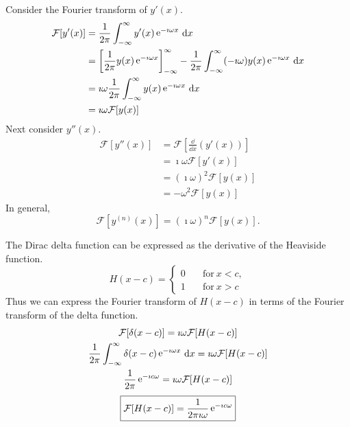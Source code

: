 Consider the Fourier transform of $y'(x)$.
\begin{align*}
  \mathcal{F}[y'(x)]
  &= \frac{1}{2\pi} \int_{-\infty}^\infty y'(x) \mathop{\mathrm{e}}\nolimits^{-\imath \omega x}\,\mathrm{d} x 
  \\
  &= \left[\frac{1}{2\pi} y(x) \mathop{\mathrm{e}}\nolimits^{-\imath \omega x} \right]_{-\infty}^\infty
  - \frac{1}{2\pi} \int_{-\infty}^\infty (-\imath \omega) y(x) \mathop{\mathrm{e}}\nolimits^{-\imath \omega x}\,\mathrm{d} x 
  \\
  &= \imath \omega \frac{1}{2\pi} \int_{-\infty}^\infty y(x) \mathop{\mathrm{e}}\nolimits^{-\imath \omega x}\,\mathrm{d} x 
  \\
  &= \imath \omega \mathcal{F}[y(x)]
\end{align*}
Next consider $y''(x)$.
\begin{align*}
  \mathcal{F}[y''(x)]
  &= \mathcal{F}\left[ \frac{\dd}{\dd x}(y'(x)) \right] 
  \\
  &= \imath \omega \mathcal{F}[y'(x)] 
  \\
  &= (\imath \omega)^2 \mathcal{F}[y(x)] 
  \\
  &= - \omega^2 \mathcal{F}[y(x)]
\end{align*}
In general,
\[ 
\boxed{ 
  \mathcal{F}\left[y^{(n)}(x)\right] = (\imath \omega)^n \mathcal{F}[y(x)]. 
  } 
\]







\begin{Example}
  The Dirac delta function can be expressed as the derivative of the 
  Heaviside function.
  \[ 
  H(x-c) = 
  \begin{cases}
    0 \quad &\mathrm{for}\ x < c, \\
    1 \quad &\mathrm{for}\ x > c
  \end{cases}
  \]
  Thus we can express the Fourier transform of $H(x-c)$ in terms of the Fourier
  transform of the delta function.
  \begin{gather*}
    \mathcal{F}[\delta(x-c)] = \imath \omega \mathcal{F}[H(x-c)] 
    \\
    \frac{1}{2\pi} \int_{-\infty}^\infty \delta(x-c) \mathop{\mathrm{e}}\nolimits^{-\imath \omega x}\,\mathrm{d} x = \imath \omega \mathcal{F}[H(x-c)] 
    \\
    \frac{1}{2\pi} \mathop{\mathrm{e}}\nolimits^{-\imath c \omega} = \imath \omega \mathcal{F}[H(x-c)]
  \end{gather*}
  \[ 
  \boxed{ 
    \mathcal{F}[H(x-c)] = \frac{1}{2\pi \imath \omega} \mathop{\mathrm{e}}\nolimits^{-\imath c \omega}
    } 
  \]
\end{Example}



















